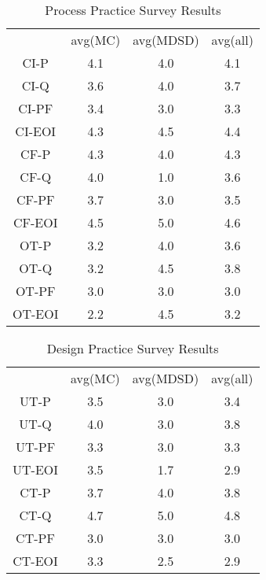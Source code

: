 \documentclass[final_report_innit.tex]{subfiles}
\newcommand\Tstrut{\rule{0pt}{2.6ex}}       %
\begin{document}
\begin{table}[h]
	\caption{Process Practice Survey Results}
	\begin{center}
		\begin{tabular}{cccc}
		
                             & avg(MC) & avg(MDSD) & avg(all) \Tstrut \\ 
		CI-P   & 4.1 & 4.0 & 4.1 \Tstrut \\ 
		CI-Q   & 3.6 & 4.0 & 3.7 \Tstrut \\ 
		CI-PF  & 3.4 & 3.0 & 3.3 \Tstrut \\ 
		CI-EOI & 4.3 & 4.5 & 4.4 \Tstrut \\ 
		CF-P   & 4.3 & 4.0 & 4.3 \Tstrut \\ 
		CF-Q   & 4.0 & 1.0 & 3.6 \Tstrut \\ 
		CF-PF  & 3.7 & 3.0 & 3.5 \Tstrut \\ 
		CF-EOI & 4.5 & 5.0 & 4.6 \Tstrut \\ 
		OT-P   & 3.2 & 4.0 & 3.6 \Tstrut \\ 
		OT-Q   & 3.2 & 4.5 & 3.8 \Tstrut \\ 
		OT-PF  & 3.0 & 3.0 & 3.0 \Tstrut \\ 
		OT-EOI & 2.2 & 4.5 & 3.2 \Tstrut \\ 
		\end{tabular}
	\end{center}
\end{table}


\begin{table}[h]
	\caption{Design Practice Survey Results}
	\begin{center}
		\begin{tabular}{cccc}
		           & avg(MC) & avg(MDSD) & avg(all) \Tstrut \\ 
			UT-P   & 3.5 & 3.0 & 3.4 \Tstrut \\  
			UT-Q   & 4.0 & 3.0 & 3.8 \Tstrut \\ 
			UT-PF  & 3.3 & 3.0 & 3.3 \Tstrut \\ 
			UT-EOI & 3.5 & 1.7 & 2.9 \Tstrut \\ 
			CT-P   & 3.7 & 4.0 & 3.8 \Tstrut \\ 
			CT-Q   & 4.7 & 5.0 & 4.8 \Tstrut \\ 
			CT-PF  & 3.0 & 3.0 & 3.0 \Tstrut \\ 
			CT-EOI & 3.3 & 2.5 & 2.9 \Tstrut \\ 
		\end{tabular}
	\end{center}
\end{table}
\end{document}
